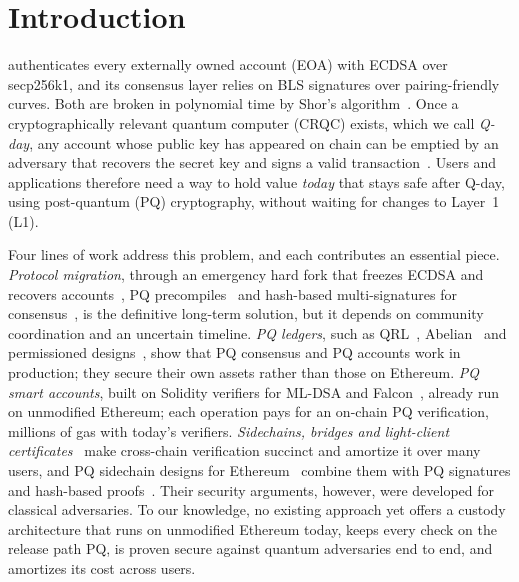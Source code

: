 \documentclass[10pt,journal,compsoc]{IEEEtran}
\theoremstyle{tplain}
\theoremstyle{tdef}
\theoremstyle{remark}
\begin{document}
\maketitle
\IEEEdisplaynontitleabstractindextext
\IEEEpeerreviewmaketitle

\section{Introduction}\label{sec:intro}

 authenticates every externally owned account (EOA) with ECDSA over secp256k1, and its consensus layer relies on BLS signatures over pairing-friendly curves. Both are broken in polynomial time by Shor's algorithm~\cite{shor1997}. Once a cryptographically relevant quantum computer (CRQC) exists, which we call \emph{Q-day}, any account whose public key has appeared on chain can be emptied by an adversary that recovers the secret key and signs a valid transaction~\cite{aggarwal2018quantum,stewart2018committing}. Users and applications therefore need a way to hold value \emph{today} that stays safe after Q-day, using post-quantum (PQ) cryptography, without waiting for changes to Layer~1 (L1).

Four lines of work address this problem, and each contributes an essential piece. \emph{Protocol migration}, through an emergency hard fork that freezes ECDSA and recovers accounts~\cite{buterin2024emergency}, PQ precompiles~\cite{eip8051} and hash-based multi-signatures for consensus~\cite{drake2025hashsig}, is the definitive long-term solution, but it depends on community coordination and an uncertain timeline. \emph{PQ ledgers}, such as QRL~\cite{QRL}, Abelian~\cite{abelian_website} and permissioned designs~\cite{Refblock14,cryptoeprint:2020/205}, show that PQ consensus and PQ accounts work in production; they secure their own assets rather than those on Ethereum. \emph{PQ smart accounts}, built on Solidity verifiers for ML-DSA and Falcon~\cite{zknox_dilithium,zknox_falcon}, already run on unmodified Ethereum; each operation pays for an on-chain PQ verification, millions of gas with today's verifiers. \emph{Sidechains, bridges and light-client certificates}~\cite{gazi2019pos,micali2020compact,algorand_stateproofs,chaidos2021mithril,xie2022zkbridge} make cross-chain verification succinct and amortize it over many users, and PQ sidechain designs for Ethereum~\cite{myeprint} combine them with PQ signatures and hash-based proofs~\cite{Virgo_conf}. Their security arguments, however, were developed for classical adversaries. To our knowledge, no existing approach yet offers a custody architecture that runs on unmodified Ethereum today, keeps every check on the release path PQ, is proven secure against quantum adversaries end to end, and amortizes its cost across users.
\end{document}
